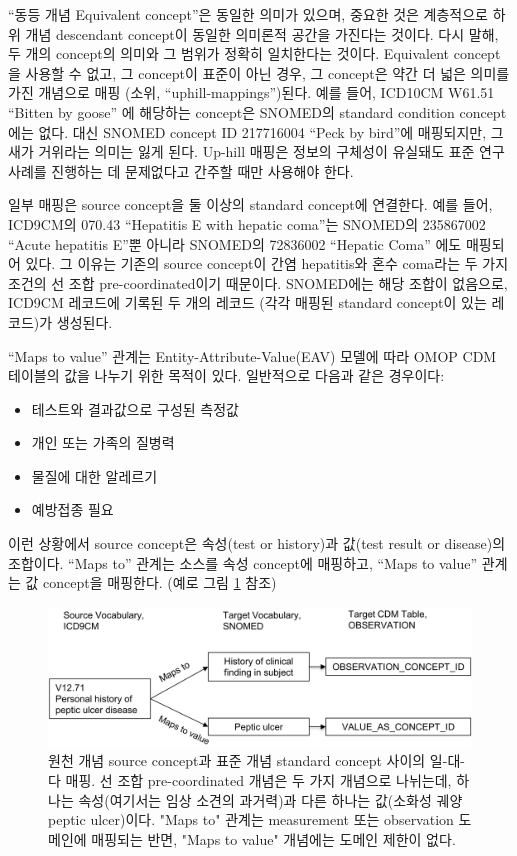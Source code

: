 \documentclass[10.5pt]{book}
\providecommand{\tightlist}{%
  \setlength{\itemsep}{0pt}\setlength{\parskip}{0pt}}
\theoremstyle{definition}
\theoremstyle{definition}
\theoremstyle{definition}
\theoremstyle{remark}
\begin{document}
``동등 개념 Equivalent concept''은 동일한 의미가 있으며, 중요한 것은
계층적으로 하위 개념 descendant concept이 동일한 의미론적 공간을
가진다는 것이다. 다시 말해, 두 개의 concept의 의미와 그 범위가 정확히
일치한다는 것이다. Equivalent concept을 사용할 수 없고, 그 concept이
표준이 아닌 경우, 그 concept은 약간 더 넓은 의미를 가진 개념으로 매핑
(소위, ``uphill-mappings'')된다. 예를 들어, ICD10CM W61.51 ``Bitten by
goose'' 에 해당하는 concept은 SNOMED의 standard condition concept에는
없다. 대신 SNOMED concept ID 217716004 ``Peck by bird''에 매핑되지만, 그
새가 거위라는 의미는 잃게 된다. Up-hill 매핑은 정보의 구체성이 유실돼도
표준 연구 사례를 진행하는 데 문제없다고 간주할 때만 사용해야 한다.

일부 매핑은 source concept을 둘 이상의 standard concept에 연결한다. 예를
들어, ICD9CM의 070.43 ``Hepatitis E with hepatic coma''는 SNOMED의
235867002 ``Acute hepatitis E''뿐 아니라 SNOMED의 72836002 ``Hepatic
Coma'' 에도 매핑되어 있다. 그 이유는 기존의 source concept이 간염
hepatitis와 혼수 coma라는 두 가지 조건의 선 조합 pre-coordinated이기
때문이다. SNOMED에는 해당 조합이 없음으로, ICD9CM 레코드에 기록된 두
개의 레코드 (각각 매핑된 standard concept이 있는 레코드)가 생성된다.

``Maps to value'' 관계는 Entity-Attribute-Value(EAV) 모델에 따라 OMOP
CDM 테이블의 값을 나누기 위한 목적이 있다. 일반적으로 다음과 같은
경우이다:

\begin{itemize}
\tightlist
\item
  테스트와 결과값으로 구성된 측정값
\item
  개인 또는 가족의 질병력
\item
  물질에 대한 알레르기
\item
  예방접종 필요
\end{itemize}

이런 상황에서 source concept은 속성(test or history)과 값(test result or
disease)의 조합이다. ``Maps to'' 관계는 소스를 속성 concept에 매핑하고,
``Maps to value'' 관계는 값 concept을 매핑한다. (예로 그림
\ref{fig:conceptValue} 참조)

\begin{figure}

{\centering \includegraphics[width=1\linewidth]{images/StandardizedVocabularies/conceptValue} 

}

\caption{원천 개념 source concept과 표준 개념 standard concept 사이의 일-대-다 매핑. 선 조합 pre-coordinated 개념은 두 가지 개념으로 나뉘는데, 하나는 속성(여기서는 임상 소견의 과거력)과 다른 하나는 값(소화성 궤양 peptic ulcer)이다. "Maps to" 관계는 measurement 또는 observation 도메인에 매핑되는 반면, "Maps to value" 개념에는 도메인 제한이 없다.}\label{fig:conceptValue}
\end{figure}
\end{document}
